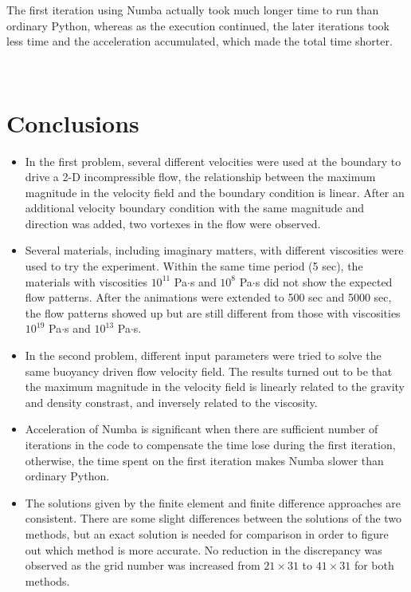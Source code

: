 \documentclass[11pt]{article}
\numberwithin{figure}{section}  %
\numberwithin{equation}{section}  %
\begin{document}
\begin{multicols}{2}
The first iteration using Numba actually took much longer time to run than ordinary Python, whereas as the execution continued, the later iterations took less time and the acceleration accumulated, which made the total time shorter.

~\\

\section{Conclusions}

\begin{itemize}
	\item{In the first problem, several different velocities were used at the boundary to drive a 2-D incompressible flow, the relationship between the maximum magnitude in the velocity field and the boundary condition is linear. After an additional velocity boundary condition with the same magnitude and direction was added, two vortexes in the flow were observed.}
	\item{Several materials, including imaginary matters, with different viscosities were used to try the experiment. Within the same time period (5 sec), the materials with viscosities $10^{11}$ Pa$\cdot$s and $10^8$ Pa$\cdot$s did not show the expected flow patterns. After the animations were extended to 500 sec and 5000 sec, the flow patterns showed up but are still different from those with viscosities $10^{19}$ Pa$\cdot$s and $10^{13}$ Pa$\cdot$s.}
	\item{In the second problem, different input parameters were tried to solve the same buoyancy driven flow velocity field. The results turned out to be that the maximum magnitude in the velocity field is linearly related to the gravity and density constrast, and inversely related to the viscosity.}
	\item{Acceleration of Numba is significant when there are sufficient number of iterations in the code to compensate the time lose during the first iteration, otherwise, the time spent on the first iteration makes Numba slower than ordinary Python.}
	\item{The solutions given by the finite element and finite difference approaches are consistent. There are some slight differences between the solutions of the two methods, but an exact solution is needed for comparison in order to figure out which method is more accurate. No reduction in the discrepancy was observed as the grid number was increased from $21\times31$ to $41\times31$ for both methods.}
\end{itemize}

~\\




\end{multicols}
\end{document}
